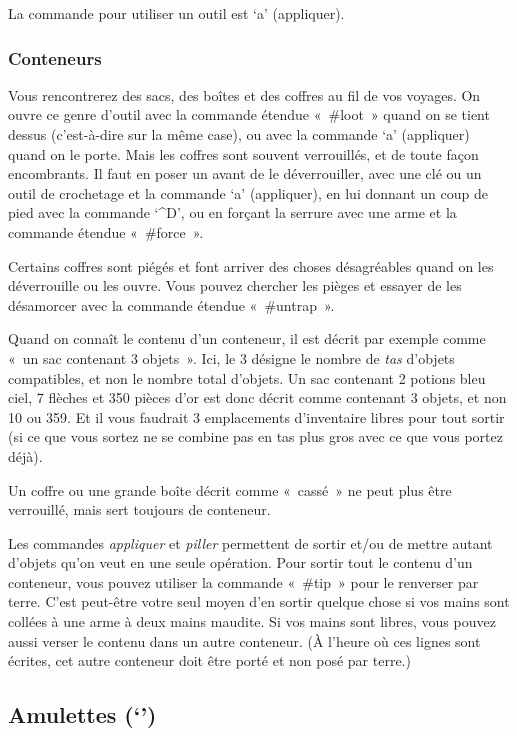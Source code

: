 \documentclass[titlepage]{article}
\begin{document}
La commande pour utiliser un outil est `a' (appliquer).

\subsubsection{Conteneurs}



Vous rencontrerez des sacs, des boîtes et des coffres au fil de vos
voyages.
On ouvre ce genre d'outil avec la commande étendue «~\#loot~» quand on
se tient dessus (c'est-à-dire sur la même case), ou avec la commande
`a' (appliquer) quand on le porte.
Mais les coffres sont souvent verrouillés, et de toute façon
encombrants.
Il faut en poser un avant de le déverrouiller, avec une clé ou un outil de
crochetage et la commande `a' (appliquer), en lui donnant un coup de
pied avec la commande `\textasciicircum{}D', ou en forçant la serrure avec une arme
et la commande étendue «~\#force~».


Certains coffres sont piégés et font arriver des choses désagréables
quand on les déverrouille ou les ouvre.
Vous pouvez chercher les pièges et essayer de les désamorcer avec la
commande étendue «~\#untrap~».


Quand on connaît le contenu d'un conteneur, il est décrit par exemple
comme «~un sac contenant 3 objets~».
Ici, le 3 désigne le nombre de \textit{tas} d'objets compatibles, et non le
nombre total d'objets.
Un sac contenant 2 potions bleu ciel, 7 flèches et 350 pièces d'or est donc
décrit comme contenant 3 objets, et non 10 ou 359.
Et il vous faudrait 3 emplacements d'inventaire libres pour tout sortir
(si ce que vous sortez ne se combine pas en tas plus gros avec ce que vous
portez déjà).


Un coffre ou une grande boîte décrit comme «~cassé~» ne peut plus être
verrouillé, mais sert toujours de conteneur.


Les commandes \textit{appliquer} et \textit{piller} permettent de sortir et/ou
de mettre autant d'objets qu'on veut en une seule opération.
Pour sortir tout le contenu d'un conteneur, vous pouvez utiliser la
commande «~\#tip~» pour le renverser par terre.
C'est peut-être votre seul moyen d'en sortir quelque chose si vos mains
sont collées à une arme à deux mains maudite.
Si vos mains sont libres, vous pouvez aussi verser le contenu dans un autre
conteneur.
(À l'heure où ces lignes sont écrites, cet autre conteneur doit être porté
et non posé par terre.)

\subsection{Amulettes (`\textquotedbl{}')}
\end{document}
